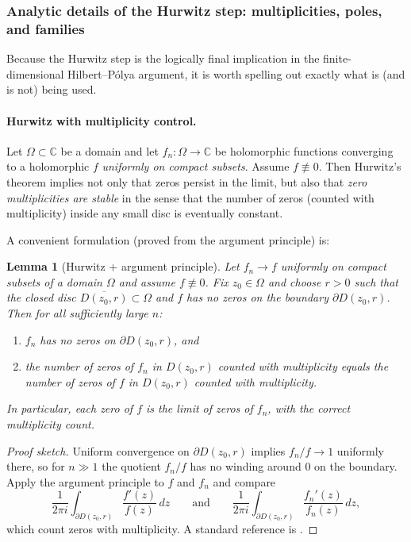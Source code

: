\documentclass[11pt,oneside]{amsbook}
\numberwithin{equation}{section}
\theoremstyle{plain}
\newtheorem{lemma}[theorem]{Lemma}
\theoremstyle{definition}
\theoremstyle{remark}
\newcommand{\C}{\mathbb{C}}
\begin{document}
\subsubsection{Analytic details of the Hurwitz step: multiplicities, poles, and families}
\label{sec:hp_hurwitz_details}

Because the Hurwitz step is the logically final implication in the finite-dimensional Hilbert--Pólya argument, it is worth spelling out exactly what is (and is not) being used.

\paragraph{Hurwitz with multiplicity control.}
Let $\Omega\subset\C$ be a domain and let $f_n:\Omega\to\C$ be holomorphic functions converging to a holomorphic $f$ \emph{uniformly on compact subsets}.
Assume $f\not\equiv 0$.
Then Hurwitz's theorem implies not only that zeros persist in the limit, but also that \emph{zero multiplicities are stable} in the sense that the number of zeros (counted with multiplicity) inside any small disc is eventually constant.

A convenient formulation (proved from the argument principle) is:

\begin{lemma}[Hurwitz + argument principle]
\label{lem:hurwitz_argument_principle}
Let $f_n\to f$ uniformly on compact subsets of a domain $\Omega$ and assume $f\not\equiv 0$.
Fix $z_0\in\Omega$ and choose $r>0$ such that the closed disc $\overline{D(z_0,r)}\subset\Omega$ and $f$ has no zeros on the boundary $\partial D(z_0,r)$.
Then for all sufficiently large $n$:
\begin{enumerate}[label=(\roman*)]
\item $f_n$ has no zeros on $\partial D(z_0,r)$, and
\item the number of zeros of $f_n$ in $D(z_0,r)$ counted with multiplicity equals the number of zeros of $f$ in $D(z_0,r)$ counted with multiplicity.
\end{enumerate}
In particular, each zero of $f$ is the limit of zeros of $f_n$, with the correct multiplicity count.
\end{lemma}

\begin{proof}[Proof sketch]
Uniform convergence on $\partial D(z_0,r)$ implies $f_n/f\to 1$ uniformly there, so for $n\gg 1$ the quotient $f_n/f$ has no winding around $0$ on the boundary.
Apply the argument principle to $f$ and $f_n$ and compare
\[
\frac{1}{2\pi i}\int_{\partial D(z_0,r)} \frac{f'(z)}{f(z)}\,dz
\qquad\text{and}\qquad
\frac{1}{2\pi i}\int_{\partial D(z_0,r)} \frac{f_n'(z)}{f_n(z)}\,dz,
\]
which count zeros with multiplicity.
A standard reference is \cite[Ch.~VI]{ConwayComplexAnalysis}.
\end{proof}
\end{document}
